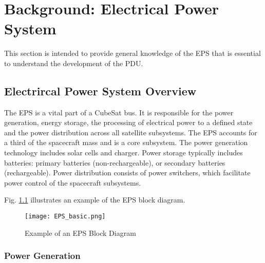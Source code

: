 \chapter{Background: Electrical Power System  \label{cha:chapter2}}
This section is intended to provide general knowledge of the EPS that is essential to understand the development of the PDU. 
 

\section{Electrircal Power System Overview \label{sec:tech}}
The EPS is a vital part of a CubeSat bus. It is responsible for the power generation, energy storage, the processing of electrical power to a defined state and the power distribution across all satellite subsystems. The EPS accounts for a third of the spacecraft mass and is a core subsystem. The power generation technology includes solar cells and charger. Power storage typically includes batteries: primary batteries (non-rechargeable), or secondary batteries (rechargeable). Power distribution consists of power switchers, which facilitate power control of the spacecraft subsystems.

Fig. \ref{fig: EPSS} illustrates an example of the EPS block diagram.



	\begin{figure}[h]
		\centering
		\texttt{[image: EPS\_basic.png]}
			\caption{Example of an EPS Block Diagram}
			\label{fig: EPSS}
	\end{figure}

\subsection{Power Generation \label{sec:tech00}}



